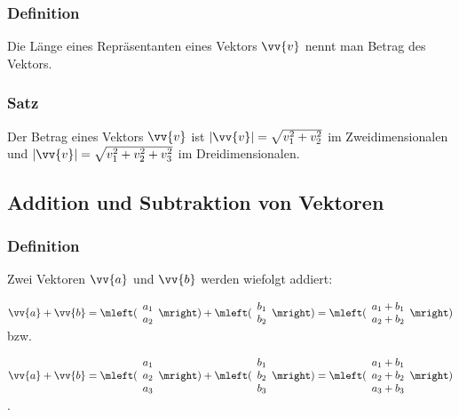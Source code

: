 \documentclass[a4paper,12pt]{article}
\begin{document}
\subsubsection{Definition}
Die Länge eines Repräsentanten eines Vektors $\vv{v}$ nennt man Betrag des Vektors. 

\subsubsection{Satz}
Der Betrag eines Vektors $\vv{v}$ ist $|\vv{v}|= \sqrt{v_1^2+v_2^2}$ im Zweidimensionalen und $|\vv{v}|= \sqrt{v_1^2+v_2^2+v_3^2}$ im Dreidimensionalen.

\subsection{Addition und Subtraktion von Vektoren}
\subsubsection{Definition}
Zwei Vektoren $\vv{a}$ und $\vv{b}$ werden wiefolgt addiert: \par
$\vv{a} + \vv{b} = \mleft( \begin{array}{c} a_1 \\ a_2  \end{array} \mright) + \mleft( \begin{array}{c} b_1 \\ b_2  \end{array} \mright) = \mleft( \begin{array}{c} a_1+b_1 \\ a_2+b_2 \end{array} \mright) $ bzw. \par  $\vv{a} + \vv{b} = \mleft( \begin{array}{c} a_1 \\ a_2 \\a_3  \end{array} \mright) + \mleft( \begin{array}{c} b_1 \\ b_2 \\ b_3 \end{array} \mright) = \mleft( \begin{array}{c} a_1+b_1 \\ a_2+b_2 \\ a_3+b_3 \end{array} \mright) $. \par
\end{document}
